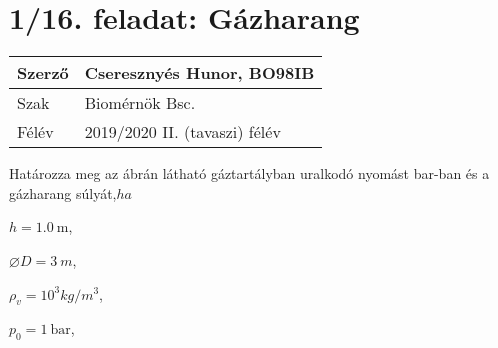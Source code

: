 \section*{1/16. feladat: Gázharang}
\begin{tabular}{ | p{2cm} | p{14cm} | } 
	\hline 
	Szerző & Cseresznyés Hunor, BO98IB \\
	\hline
	Szak & Biomérnök Bsc. \\
	\hline	Félév & 2019/2020 II. (tavaszi) félév  \\
	\hline
\end{tabular}
\vspace{0.5cm}


\noindent Határozza meg az ábrán látható gáztartályban uralkodó nyomást bar-ban és a gázharang súlyát,$ha$

$h = \SI{1,0}{\m}$,

$\varnothing D = \SI{3}{m}$,

$\rho_v = 10^3 kg/m^3$,

$p_0 = \SI{1}{\bar}$,


